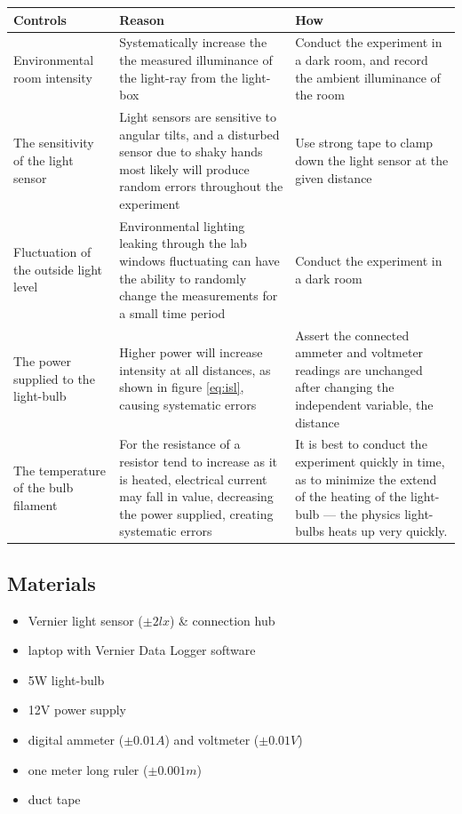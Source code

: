 \documentclass[a4paper,12pt]{article}
\begin{document}
\begin{longtable}{P{0.2\textwidth}|P{0.35\textwidth}|P{0.35\textwidth}}
Controls & Reason & How\\\hline
Environmental room intensity & Systematically increase the the measured illuminance of the light-ray from the light-box & Conduct the experiment in a dark room, and record the ambient illuminance of the room \\

The sensitivity of the light sensor & Light sensors are sensitive to angular tilts, and a disturbed sensor due to shaky hands most likely will produce random errors throughout the experiment & Use strong tape to clamp down the light sensor at the given distance\\

Fluctuation of the outside light level & Environmental lighting leaking through the lab windows fluctuating can have the ability to randomly change the measurements for a small time period & Conduct the experiment in a dark room \\

The power supplied to the light-bulb & Higher power will increase intensity at all distances, as shown in figure \ref{eq:isl}, causing systematic errors & Assert the connected ammeter and voltmeter readings are unchanged after changing the independent variable, the distance\\

The temperature of the bulb filament & For the resistance of a resistor tend to increase as it is heated, electrical current may fall in value, decreasing the power supplied, creating systematic errors & It is best to conduct the experiment quickly in time, as to minimize the extend of the heating of the light-bulb --- the physics light-bulbs heats up very quickly.

\end{longtable}

\newpage

\subsection{Materials}
\begin{itemize}
 \item Vernier light sensor ($\pm 2\si{lx}$) \parencite{vernier_manual} \& connection hub
 \item laptop with Vernier Data Logger software
 \item 5W light-bulb
 \item 12V power supply
 \item digital ammeter ($\pm 0.01\si{A}$) and voltmeter ($\pm 0.01\si{V}$)
 \item one meter long ruler ($\pm 0.001\si{m}$)
 \item duct tape
 \end{itemize}
\end{document}
